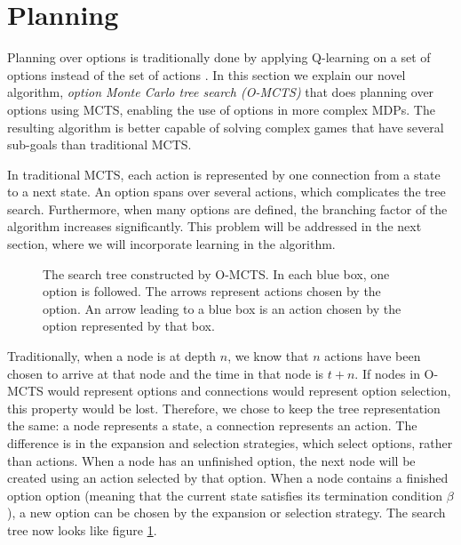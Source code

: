 \section{Planning}
\label{sec:planning}


Planning over options is traditionally done by applying Q-learning on a set of
options instead of the set of actions \cite{sutton1999between}. In this section
we explain our novel algorithm, \emph{option Monte Carlo tree search (O-MCTS)}
that does planning over options using MCTS, enabling the use of options in more
complex MDPs. The resulting algorithm is better capable of solving complex games
that have several sub-goals than traditional MCTS.

In traditional MCTS, each action is represented by one connection from a state to a
next state. An option spans over several actions, which complicates the tree
search. Furthermore, when many options are defined, the branching factor of
the algorithm increases significantly. This problem will be addressed in the
next section, where we will incorporate learning in the algorithm.

\begin{figure}
	\centering
	\caption{The search tree constructed by O-MCTS. In each blue box, one option
	is followed. The arrows represent actions chosen by the option. An arrow
leading to a blue box is an action chosen by the option represented by that box.}
	\label{fig:omcts-tree}
\end{figure}

Traditionally, when a node is at depth $n$, we know that $n$ actions have been
chosen to arrive at that node and the time in that node is $t+n$. 
If nodes in O-MCTS would represent options and connections would represent
option selection, this property would be lost. Therefore, we chose to keep
the tree representation the same: a node represents a state, a connection
represents an action. The difference is in the expansion and selection
strategies, which select options, rather than actions. When a node has an
unfinished option, the next node will be created using an action selected by
that option. When a node contains a finished option option (meaning that the
current state satisfies its termination condition $\beta$), a new option can be
chosen by the expansion or selection strategy. The search tree now looks like
figure \ref{fig:omcts-tree}.  

